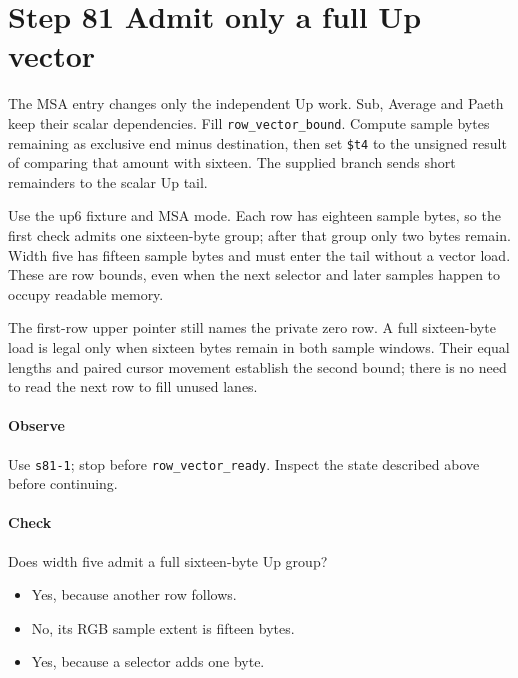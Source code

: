 \section{Step 81 Admit only a full Up vector}
The MSA entry changes only the independent Up work. Sub, Average and Paeth keep their scalar dependencies. Fill \texttt{row\_vector\_bound}. Compute sample bytes remaining as exclusive end minus destination, then set \texttt{\$t4} to the unsigned result of comparing that amount with sixteen. The supplied branch sends short remainders to the scalar Up tail.

Use the up6 fixture and MSA mode. Each row has eighteen sample bytes, so the first check admits one sixteen-byte group; after that group only two bytes remain. Width five has fifteen sample bytes and must enter the tail without a vector load. These are row bounds, even when the next selector and later samples happen to occupy readable memory.

The first-row upper pointer still names the private zero row. A full sixteen-byte load is legal only when sixteen bytes remain in both sample windows. Their equal lengths and paired cursor movement establish the second bound; there is no need to read the next row to fill unused lanes.

\paragraph{Observe} Use \texttt{s81-1}; stop before \texttt{row\_vector\_ready}. Inspect the state described above before continuing.

\paragraph{Check} Does width five admit a full sixteen-byte Up group?
\begin{itemize}
  \item[A.] Yes, because another row follows.
  \item[B.] No, its RGB sample extent is fifteen bytes.
  \item[C.] Yes, because a selector adds one byte.
\end{itemize}
